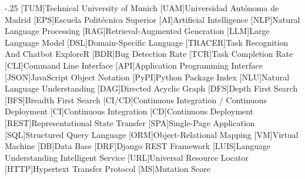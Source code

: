 \documentclass[headsepline,footsepline,footinclude=false,oneside,fontsize=11pt,paper=a4,listof=totoc,bibliography=totoc]{scrbook} %
\begin{document}

\frontmatter{}





\tableofcontents{}

\mainmatter{}









\appendix{}




\begin{acronym}
	\itemsep-.25\baselineskip
	[TUM]{Technical University of Munich}
  [UAM]{Universidad Autónoma de Madrid}
  [EPS]{Escuela Politécnica Superior}
  [AI]{Artificial Intelligence}
  [NLP]{Natural Language Processing}
  [RAG]{Retrieval-Augmented Generation}
  [LLM]{Large Language Model}
  [DSL]{Domain-Specific Language}
  [TRACER]{Task Recognition And Chatbot ExploreR}
  [BDR]{Bug Detection Rate}
  [TCR]{Task Completion Rate}
  [CLI]{Command Line Interface}
  [API]{Application Programming Interface}
  [JSON]{JavaScript Object Notation}
  [PyPI]{Python Package Index}
  [NLU]{Natural Language Understanding}
  [DAG]{Directed Acyclic Graph}
  [DFS]{Depth First Search}
  [BFS]{Breadth First Search}
  [CI/CD]{Continuous Integration / Continuous Deployment}
  [CI]{Continuous Integration}
  [CD]{Continuous Deployment}
  [REST]{Representational State Transfer}
  [SPA]{Single-Page Application}
  [SQL]{Structured Query Language}
  [ORM]{Object-Relational Mapping}
  [VM]{Virtual Machine}
  [DB]{Data Base}
  [DRF]{Django REST Framework}
  [LUIS]{Language Understanding Intelligent Service}
  [URL]{Universal Resource Locator}
  [HTTP]{Hypertext Transfer Protocol}
  [MS]{Mutation Score}
\end{acronym}

\listoffigures{}
\listoftables{}
\printbibliography{}
\end{document}
